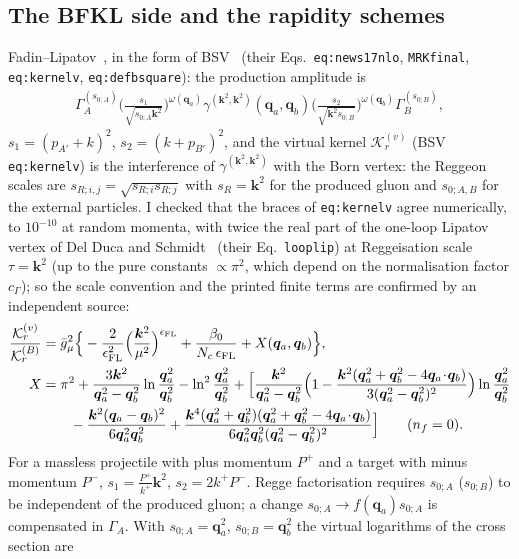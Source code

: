 \documentclass[11pt,a4paper]{article}
\renewcommand{\v}[1]{\bm{#1}}
\begin{document}
\subsection{The BFKL side and the rapidity schemes}
Fadin--Lipatov~\cite{FL}, in the form of BSV~\cite{BSV} (their Eqs.~\texttt{eq:news17nlo}, \texttt{MRKfinal}, \texttt{eq:kernelv}, \texttt{eq:defbsquare}): the production amplitude is
\begin{align}
\Gamma_A^{(s_{0;A})}\Big(\frac{s_{1}}{\sqrt{s_{0;A}\v k^2}}\Big)^{\omega(\v q_a)}\gamma^{(\v k^2,\v k^2)}(\v q_a,\v q_b)\Big(\frac{s_{2}}{\sqrt{\v k^2s_{0;B}}}\Big)^{\omega(\v q_b)}\Gamma_B^{(s_{0;B})},\label{regge}
\end{align}
$s_1=(p_{A'}+k)^2$, $s_2=(k+p_{B'})^2$, and the virtual kernel $\mathcal K^{(v)}_r$ (BSV \texttt{eq:kernelv}) is the interference of $\gamma^{(\v k^2,\v k^2)}$ with the Born vertex: the Reggeon scales are $s_{R;i,j}=\sqrt{s_{R;i}s_{R;j}}$ with $s_{R}=\v k^2$ for the produced gluon and $s_{0;A,B}$ for the external particles. I checked that the braces of \texttt{eq:kernelv} agree numerically, to $10^{-10}$ at random momenta, with twice the real part of the one-loop Lipatov vertex of Del Duca and Schmidt~\cite{DDS} (their Eq.~\texttt{looplip}) at Reggeisation scale $\tau=\v k^2$ (up to the pure constants $\propto\pi^2$, which depend on the normalisation factor $c_\Gamma$); so the scale convention and the printed finite terms are confirmed by an independent source:
\begin{align}
\frac{\mathcal K_r^{(v)}}{\mathcal K_r^{(B)}}&=\bar g_\mu^2\Big\{-\frac{2}{\epsilon_{\rm FL}^2}\Big(\frac{\v k^2}{\mu^2}\Big)^{\epsilon_{\rm FL}}+\frac{\beta_0}{N_c\,\epsilon_{\rm FL}}+X(\v q_a,\v q_b)\Big\},\notag\\
X&=\pi^2+\frac{3\v k^2}{\v q_a^2-\v q_b^2}\ln\frac{\v q_a^2}{\v q_b^2}-\ln^2\frac{\v q_a^2}{\v q_b^2}+\Big[\frac{\v k^2}{\v q_a^2-\v q_b^2}\Big(1-\frac{\v k^2(\v q_a^2+\v q_b^2-4\v q_a\!\cdot\!\v q_b)}{3(\v q_a^2-\v q_b^2)^2}\Big)\ln\frac{\v q_a^2}{\v q_b^2}\notag\\
&\qquad-\frac{\v k^2(\v q_a-\v q_b)^2}{6\v q_a^2\v q_b^2}+\frac{\v k^4(\v q_a^2+\v q_b^2)(\v q_a^2+\v q_b^2-4\v q_a\!\cdot\!\v q_b)}{6\v q_a^2\v q_b^2(\v q_a^2-\v q_b^2)^2}\Big]\qquad(n_f=0).\label{X}
\end{align}
For a massless projectile with plus momentum $P^+$ and a target with minus momentum $P^-$, $s_1=\frac{P^+}{k^+}\v k^2$, $s_2=2k^+P^-$. Regge factorisation requires $s_{0;A}$ ($s_{0;B}$) to be independent of the produced gluon; a change $s_{0;A}\to f(\v q_a)s_{0;A}$ is compensated in $\Gamma_A$. With $s_{0;A}=\v q_a^2$, $s_{0;B}=\v q_b^2$ the virtual logarithms of the cross section are
\end{document}
